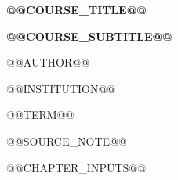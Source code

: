 \documentclass[UTF8,oneside,11pt,fontset=fandol]{ctexbook}
\begin{document}
\begin{titlepage}
\thispagestyle{empty}
\vspace*{2.3cm}
\noindent{\color{masblue}\rule{\linewidth}{2.2pt}}\par
\vspace{1.1cm}
{\Huge\bfseries @@COURSE_TITLE@@\par}
\vspace{0.45cm}
{\Large\bfseries @@COURSE_SUBTITLE@@\par}
\vspace{1.5cm}
{\large @@AUTHOR@@\par}
\vspace{0.35cm}
{\large @@INSTITUTION@@\par}
\vspace{0.35cm}
{\large @@TERM@@\par}
\vfill
\noindent{\color{masblue}\rule{0.42\linewidth}{1.1pt}}\par
\vspace{0.35cm}
{\small @@SOURCE_NOTE@@\par}
\end{titlepage}

\frontmatter
\tableofcontents
\mainmatter
@@CHAPTER_INPUTS@@
\end{document}
